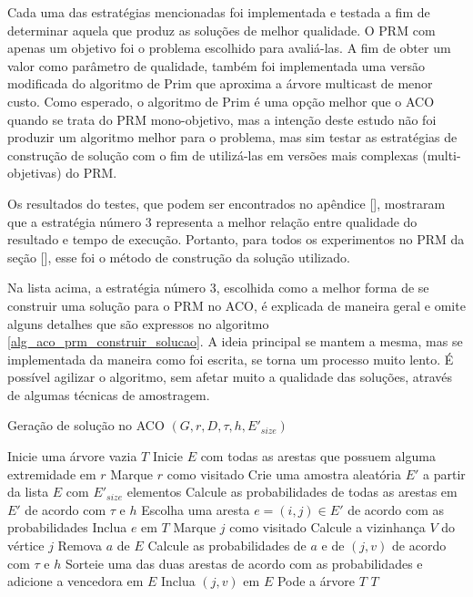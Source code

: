 Cada uma das estratégias mencionadas foi implementada e testada a fim de determinar aquela que produz as soluções de melhor qualidade. O PRM com apenas um objetivo foi o problema escolhido para avaliá-las. A fim de obter um valor como parâmetro de qualidade, também foi implementada uma versão modificada do algoritmo de Prim que aproxima a árvore multicast de menor custo. Como esperado, o algoritmo de Prim é uma opção melhor que o ACO quando se trata do PRM mono-objetivo, mas a intenção deste estudo não foi produzir um algoritmo melhor para o problema, mas sim testar as estratégias de construção de solução com o fim de utilizá-las em versões mais complexas (multi-objetivas) do PRM.

Os resultados do testes, que podem ser encontrados no apêndice [], mostraram que a estratégia número 3 representa a melhor relação entre qualidade do resultado e tempo de execução. Portanto, para todos os experimentos no PRM da seção [], esse foi o método de construção da solução utilizado.

Na lista acima, a estratégia número 3, escolhida como a melhor forma de se construir uma solução para o PRM no ACO, é explicada de maneira geral e omite alguns detalhes que são expressos no algoritmo \ref{alg_aco_prm_construir_solucao}. A ideia principal se mantem a mesma, mas se implementada da maneira como foi escrita, se torna um processo muito lento. É possível agilizar o algoritmo, sem afetar muito a qualidade das soluções, através de algumas técnicas de amostragem.

\begin{algorithm}
	\caption{Geração de solução no ACO $(G, r, D, \tau, h, E'_{size})$}
	\label{alg_aco_prm_construir_solucao}
	\begin{algorithmic}[1]
		\State Inicie uma árvore vazia $T$
		\State Inicie $E$ com todas as arestas que possuem alguma extremidade em $r$
		\State Marque $r$ como visitado
			\State Crie uma amostra aleatória $E'$ a partir da lista $E$ com $E'_{size}$ elementos
			\State Calcule as probabilidades de todas as arestas em $E'$ de acordo com $\tau$ e $h$
			\State Escolha uma aresta $e=(i,j) \in E'$ de acordo com as probabilidades
			\State Inclua $e$ em $T$
			\State Marque $j$ como visitado
			\State Calcule a vizinhança $V$ do vértice $j$
					\State Remova $a$ de $E$
					\State Calcule as probabilidades de $a$ e de $(j, v)$ de acordo com $\tau$ e $h$
					\State Sorteie uma das duas arestas de acordo com as probabilidades e adicione a vencedora em $E$
					\State Inclua $(j, v)$ em $E$
				\EndIf
			\EndFor
		\EndWhile
		\State Pode a árvore $T$
		\State \Return $T$
	\end{algorithmic}
\end{algorithm}

